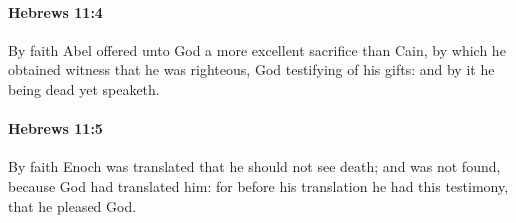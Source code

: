		\paragraph{Hebrews 11:4} %
			\label{HEBREWS-11-4}

			By faith Abel offered unto God a more excellent sacrifice than Cain, by which he obtained witness that he was righteous, God testifying of his gifts: and by it he being dead yet speaketh.

			\begin{framed}
			\scriptsize
				\begin{compactdesc}
					\item[SBLG] 
				\end{compactdesc}
			\end{framed}

		\paragraph{Hebrews 11:5} %
			\label{HEBREWS-11-5}

			By faith Enoch was translated that he should not see death; and was not found, because God had translated him: for before his translation he had this testimony, that he pleased God.

